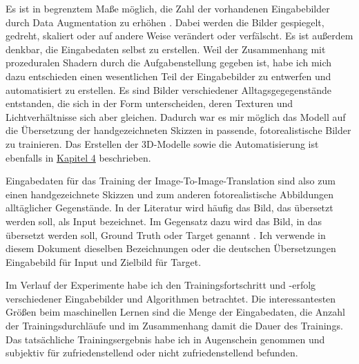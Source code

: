 Es ist in begrenztem Maße möglich, die Zahl der vorhandenen Eingabebilder durch Data Augmentation zu erhöhen \cite{chollet2021deep}. Dabei werden die Bilder gespiegelt, gedreht, skaliert oder auf andere Weise verändert oder verfälscht. Es ist außerdem denkbar, die Eingabedaten selbst zu erstellen. Weil der Zusammenhang mit prozeduralen Shadern durch die Aufgabenstellung gegeben ist, habe ich mich dazu entschieden einen wesentlichen Teil der Eingabebilder zu entwerfen und automatisiert zu erstellen. Es sind Bilder verschiedener Alltagsgegegenstände entstanden, die sich in der Form unterscheiden, deren Texturen und Lichtverhältnisse sich aber gleichen. Dadurch war es mir möglich das Modell auf die Übersetzung der handgezeichneten Skizzen in passende, fotorealistische Bilder zu trainieren. Das Erstellen der 3D-Modelle sowie die Automatisierung ist ebenfalls in \hyperref[ch:conduct]{Kapitel 4} beschrieben.

Eingabedaten für das Training der Image-To-Image-Translation sind also zum einen handgezeichnete Skizzen und zum anderen fotorealistische Abbildungen alltäglicher Gegenstände. In der Literatur wird häufig das Bild, das übersetzt werden soll, als Input bezeichnet. Im Gegensatz dazu wird das Bild, in das übersetzt werden soll, Ground Truth oder Target genannt \cite{chollet2021deep}. Ich verwende in diesem Dokument dieselben Bezeichnungen oder die deutschen Übersetzungen Eingabebild für Input und Zielbild für Target.

Im Verlauf der Experimente habe ich den Trainingsfortschritt und -erfolg verschiedener Eingabebilder und Algorithmen betrachtet. Die interessantesten Größen beim maschinellen Lernen sind die Menge der Eingabedaten, die Anzahl der Trainingsdurchläufe und im Zusammenhang damit die Dauer des Trainings. Das tatsächliche Trainingsergebnis habe ich in Augenschein genommen und subjektiv für zufriedenstellend oder nicht zufriedenstellend befunden.

